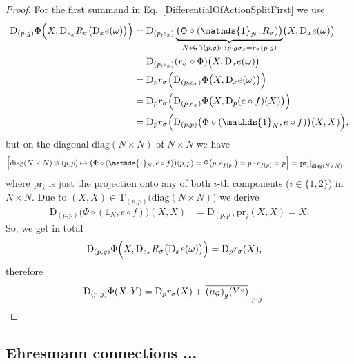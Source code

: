 \documentclass[reqno,a4paper,oneside]{amsart}
\theoremstyle{plain}
\theoremstyle{remark}
\theoremstyle{definition}
\begin{document}
\begin{proof}
For the first summand in Eq.\ \eqref{DifferentialOfActionSplitFirst} we use
\begin{align*}
\mathrm{D}_{(p, g)}\Phi\Bigl(X, \mathrm{D}_{e_x}R_\sigma \bigl( \mathrm{D}_x e (\omega) \bigr) \Bigr)
&=
\mathrm{D}_{(p, e_x)} \underbrace{\bigl( \Phi \circ \mleft( \mathds{1}_N, R_\sigma \mright) \bigr)}_{\mathclap{ N * \mathcal{G} \ni (p, g) \mapsto p \cdot g \sigma_x = r_\sigma(p \cdot g) }}
	\bigl( X, \mathrm{D}_x e(\omega) \bigr)
\\
&=
\mathrm{D}_{(p, e_x)}( r_\sigma \circ \Phi ) \bigl( X, \mathrm{D}_x e(\omega) \bigr)
\\
&=
\mathrm{D}_p r_\sigma \Bigl(
	\mathrm{D}_{(p, e_x)} \Phi \bigl( X, \mathrm{D}_x e(\omega) \bigr)
\Bigr)
\\
&=
\mathrm{D}_p r_\sigma \Bigl(
	\mathrm{D}_{(p, e_x)} \Phi \bigl( X, \mathrm{D}_p (e \circ f) (X) \bigr)
\Bigr)
\\
&=
\mathrm{D}_p r_\sigma \Bigl(
	\mathrm{D}_{(p, p)} \bigl(\Phi \circ (\mathds{1}_N, e\circ f)\bigr)( X, X )
\Bigr),
\end{align*}
but on the diagonal $\mathrm{diag}(N\times N)$ of $N\times N$ we have
\begin{align*}
\Bigl[
\mathrm{diag}(N \times N) \ni (p,p)
\mapsto
\bigl(\Phi \circ (\mathds{1}_N, e\circ f)\bigr)(p,p)
=
\Phi\mleft(p, e_{f(p)}\mright)
=
p \cdot e_{f(p)}
=
p
\Bigr]
&=
\mleft.\mathrm{pr}_i\mright|_{\mathrm{diag}(N \times N)},
\end{align*}
where $\mathrm{pr}_i$ is just the projection onto any of both $i$-th components ($i \in \{1,2\}$) in $N \times N$. Due to $(X, X) \in \mathrm{T}_{(p,p)}\bigl( \mathrm{diag}(N\times N) \bigr)$ we derive
\begin{align*}
\mathrm{D}_{(p, p)} \bigl(\Phi \circ (\mathds{1}_N, e\circ f)\bigr)( X, X )
&=
\mathrm{D}_{(p,p)} \mathrm{pr}_i( X, X )
=
X.
\end{align*}
So, we get in total
\begin{align*}
\mathrm{D}_{(p, g)}\Phi\Bigl(X, \mathrm{D}_{e_x}R_\sigma \bigl( \mathrm{D}_x e (\omega) \bigr) \Bigr)
&=
\mathrm{D}_pr_\sigma(X),
\end{align*}
therefore
\begin{align*}
\mathrm{D}_{(p, g)}\Phi(X, Y)
&=
\mathrm{D}_pr_\sigma(X)
	+ \mleft.{\overline{\mleft( \mu_{\mathcal{G}}\mright)_g (Y^v)}}\mright|_{p \cdot g}.
\end{align*}
\end{proof}

\subsection{Ehresmann connections ...}
\end{document}
